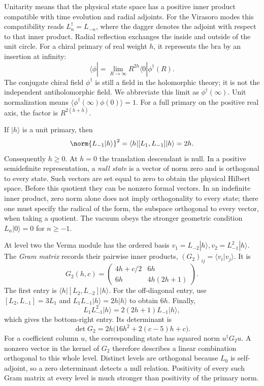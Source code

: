 Unitarity means that the physical state space has a positive inner
product compatible with time evolution and radial adjoints. For the
Virasoro modes this compatibility reads
$L_n^\dagger=L_{-n}$, where the dagger denotes the adjoint with
respect to that inner product. Radial reflection exchanges the inside
and outside of the unit circle. For a chiral primary of real weight
$h$, it represents the bra by an insertion at infinity:
\[
 \langle\phi|=\lim_{R\to\infty}R^{2h}
                    \langle0|\phi^\dagger(R).
\]
The conjugate chiral field $\phi^\dagger$ is still a field in the
holomorphic theory; it is not the independent antiholomorphic field.
We abbreviate this limit as $\phi^\dagger(\infty)$. Unit normalization
means $\langle\phi^\dagger(\infty)\phi(0)\rangle=1$.
For a full primary on the positive real axis, the factor is
$R^{2(h+\bar h)}$.

If $|h\rangle$ is a unit primary, then
\[
 \norm{L_{-1}|h\rangle}^2
 =\langle h|[L_1,L_{-1}]|h\rangle=2h.
\]
Consequently $h\ge0$. At $h=0$ the translation descendant is null.
In a positive semidefinite representation, a \emph{null state} is
a vector of norm zero and is orthogonal to every state. Such vectors
are set equal to zero to obtain the physical Hilbert space. Before
this quotient they can be nonzero formal vectors. In an indefinite
inner product, zero norm alone does not imply orthogonality to every
state; there one must specify the radical of the form, the subspace
orthogonal to every vector, when taking a quotient.
The vacuum obeys the stronger geometric condition
$L_n|0\rangle=0$ for $n\ge-1$.

\begin{example}
\label{ex:cft-level2}
At level two the Verma module has the ordered basis
$v_1=L_{-2}|h\rangle,v_2=L_{-1}^2|h\rangle$.
The \emph{Gram matrix} records their pairwise inner products,
$(G_2)_{ij}=\langle v_i|v_j\rangle$. It is
\begin{equation}
 G_2(h,c)=
 \begin{pmatrix}
 4h+c/2&6h\\
 6h&4h(2h+1)
 \end{pmatrix}.
 \label{eq:cft-gram2}
\end{equation}
The first entry is $\langle h|[L_2,L_{-2}]|h\rangle$.
For the off-diagonal entry, use
$[L_2,L_{-1}]=3L_1$ and
$L_1L_{-1}|h\rangle=2h|h\rangle$ to obtain $6h$.
Finally,
\[
 L_1L_{-1}^2|h\rangle=2(2h+1)L_{-1}|h\rangle,
\]
which gives the bottom-right entry. Its determinant is
\[
 \det G_2=2h\bigl(16h^2+2(c-5)h+c\bigr).
\]
For a coefficient column $u$, the corresponding state has squared
norm $u^\dagger G_2u$. A nonzero vector in the kernel of $G_2$
therefore describes a linear combination orthogonal to this whole
level. Distinct levels are orthogonal because $L_0$ is self-adjoint,
so a zero determinant detects a null relation. Positivity of every such Gram matrix
at every level is much stronger than positivity of the primary norm.
\end{example}

